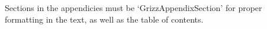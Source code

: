 

Sections in the appendicies must be `GrizzAppendixSection' for proper formatting in the text, as well as the table of contents.

